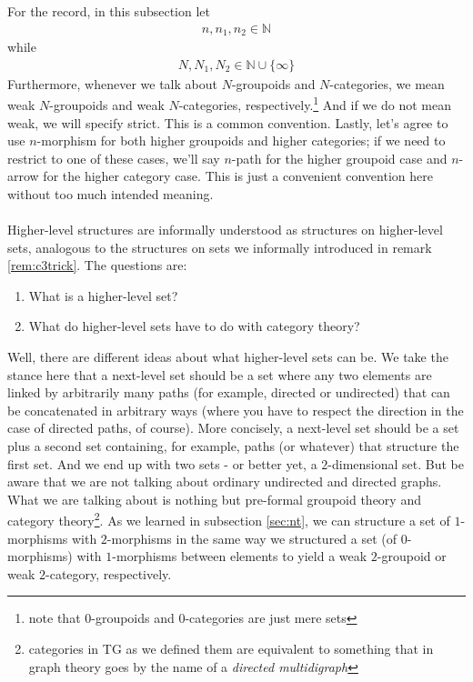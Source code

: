 For the record, in this subsection let
\begin{align*}
  n,
  n_{1},
  n_{2}
  \in
  \mathbb{N}
\end{align*}
while
\begin{align*}
  N,
  N_{1},
  N_{2}
  \in
  \mathbb{N}
  \cup
  \lbrace
    \infty
  \rbrace
\end{align*}
Furthermore, whenever we talk about $N$-groupoids and $N$-categories, we mean weak $N$-groupoids and weak $N$-categories, respectively.\footnote{note that $0$-groupoids and $0$-categories are just mere sets}
And if we do not mean weak, we will specify strict.
This is a common convention.
Lastly, let's agree to use $n$-morphism for both higher groupoids and higher categories; if we need to restrict to one of these cases, we'll say $n$-path for the higher groupoid case and $n$-arrow for the higher category case.
This is just a convenient convention here without too much intended meaning.
\\\\
Higher-level structures are informally understood as structures on higher-level sets, analogous to the structures on sets we informally introduced in remark \ref{rem:c3trick}.
The questions are:
\begin{enumerate}
\item[$\bullet$]
What is a higher-level set?
\item[$\bullet$]
What do higher-level sets have to do with category theory?
\end{enumerate}
Well, there are different ideas about what higher-level sets can be.
We take the stance here that a next-level set should be a set where any two elements are linked by arbitrarily many paths (for example, directed or undirected) that can be concatenated in arbitrary ways (where you have to respect the direction in the case of directed paths, of course).
More concisely, a next-level set should be a set plus a second set containing, for example, paths (or whatever) that structure the first set.
And we end up with two sets - or better yet, a $2$-dimensional set.
But be aware that we are not talking about ordinary undirected and directed graphs.
What we are talking about is nothing but pre-formal groupoid theory and category theory\footnote{categories in TG as we defined them are equivalent to something that in graph theory goes by the name of a \textit{directed multidigraph}}.
As we learned in subsection \ref{sec:nt}, we can structure a set of $1$-morphisms with $2$-morphisms in the same way we structured a set (of $0$-morphisms) with $1$-morphisms between elements to yield a weak $2$-groupoid or weak $2$-category, respectively.

